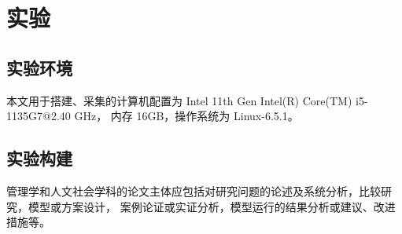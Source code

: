 \section{实验}
\label{section:experiment}
\subsection{实验环境}
    本文用于搭建、采集的计算机配置为 Intel 11th Gen Intel(R) Core(TM) i5-1135G7@2.40 GHz，
    内存 16GB，操作系统为 Linux-6.5.1。
\subsection{实验构建}
    管理学和人文社会学科的论文主体应包括对研究问题的论述及系统分析，比较研究，模型或方案设计，
    案例论证或实证分析，模型运行的结果分析或建议、改进措施等。
